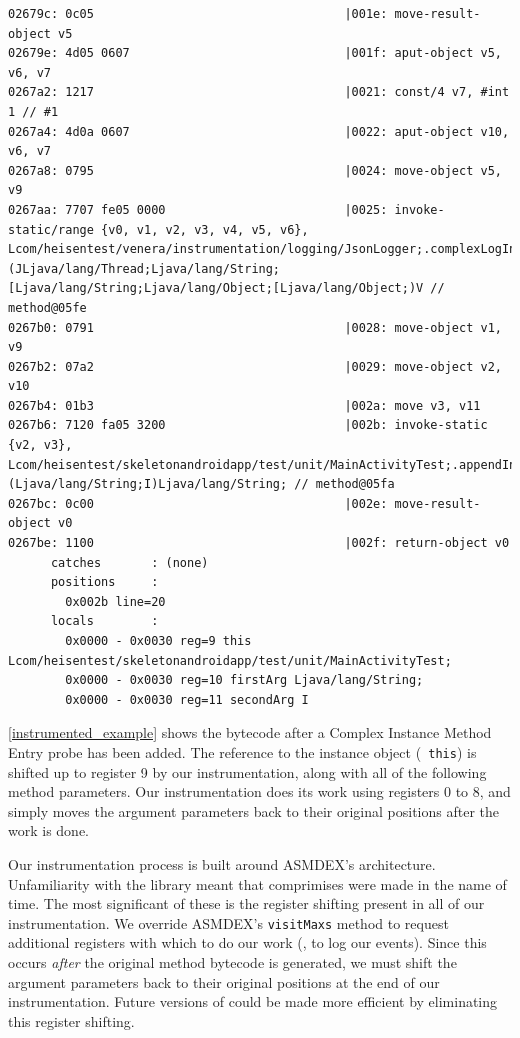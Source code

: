 \begin{lstlisting}[label=instrumented_example]
02679c: 0c05                                   |001e: move-result-object v5
02679e: 4d05 0607                              |001f: aput-object v5, v6, v7
0267a2: 1217                                   |0021: const/4 v7, #int 1 // #1
0267a4: 4d0a 0607                              |0022: aput-object v10, v6, v7
0267a8: 0795                                   |0024: move-object v5, v9
0267aa: 7707 fe05 0000                         |0025: invoke-static/range {v0, v1, v2, v3, v4, v5, v6}, Lcom/heisentest/venera/instrumentation/logging/JsonLogger;.complexLogInstanceMethodEntry:(JLjava/lang/Thread;Ljava/lang/String;[Ljava/lang/String;Ljava/lang/Object;[Ljava/lang/Object;)V // method@05fe
0267b0: 0791                                   |0028: move-object v1, v9
0267b2: 07a2                                   |0029: move-object v2, v10
0267b4: 01b3                                   |002a: move v3, v11
0267b6: 7120 fa05 3200                         |002b: invoke-static {v2, v3}, Lcom/heisentest/skeletonandroidapp/test/unit/MainActivityTest;.appendIntToString:(Ljava/lang/String;I)Ljava/lang/String; // method@05fa
0267bc: 0c00                                   |002e: move-result-object v0
0267be: 1100                                   |002f: return-object v0
      catches       : (none)
      positions     : 
        0x002b line=20
      locals        : 
        0x0000 - 0x0030 reg=9 this Lcom/heisentest/skeletonandroidapp/test/unit/MainActivityTest; 
        0x0000 - 0x0030 reg=10 firstArg Ljava/lang/String; 
        0x0000 - 0x0030 reg=11 secondArg I 
\end{lstlisting}

\autoref{instrumented_example} shows the bytecode after a Complex Instance
Method Entry probe has been added. The reference to the instance object ({\tt
this}) is shifted up to register 9 by our instrumentation, along with all of the
following method parameters. Our instrumentation does its work using registers 0
to 8, and simply moves the argument parameters back to their original positions
after the work is done.

Our instrumentation process is built around ASMDEX's architecture. Unfamiliarity
with the library meant that comprimises were made in the name of time. The most
significant of these is the register shifting present in all of our
instrumentation. We override ASMDEX's {\tt visitMaxs} method to request
additional registers with which to do our work (\ie, to log our events). Since
this occurs \textit{after} the original method bytecode is generated, we must
shift the argument parameters back to their original positions at the end of our
instrumentation. Future versions of \venera could be made more efficient by
eliminating this register shifting.

